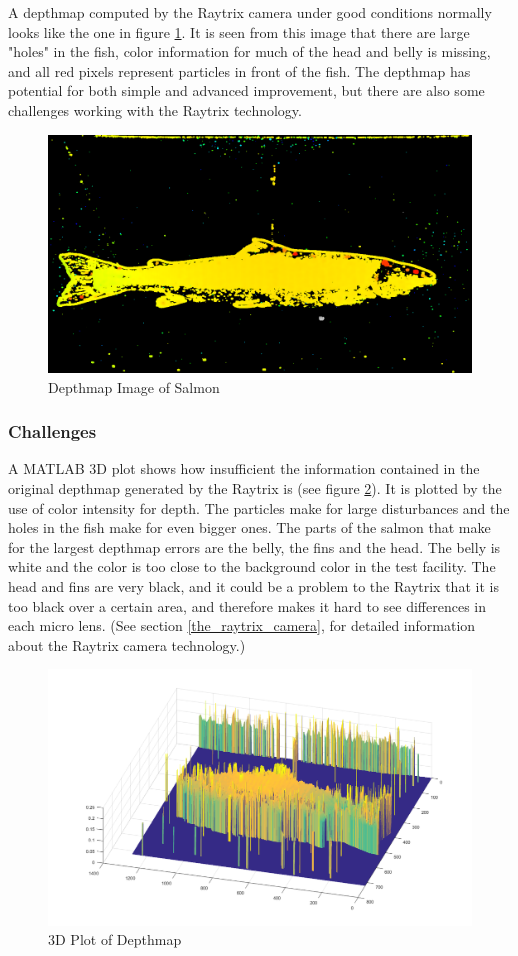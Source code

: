 A depthmap computed by the Raytrix camera under good conditions normally looks like the one in figure \ref{fig:depthmap82}. It is seen from this image that there are large "holes" in the fish, color information for much of the head and belly is missing, and all red pixels represent particles in front of the fish. The depthmap has potential for both simple and advanced improvement, but there are also some challenges working with the Raytrix technology.

\begin{figure}[H]
    \centering
    \includegraphics[width=.7\linewidth]{images/aim_of_study/depthmap82}
    \caption{Depthmap Image of Salmon}
    \label{fig:depthmap82}
\end{figure}



\subsubsection{Challenges}

A MATLAB 3D plot shows how insufficient the information contained in the original depthmap generated by the Raytrix is (see figure \ref{fig:matlab3D}). It is plotted by the use of color intensity for depth. The particles make for large disturbances and the holes in the fish make for even bigger ones. The parts of the salmon that make for the largest depthmap errors are the belly, the fins and the head. The belly is white and the color is too close to the background color in the test facility. The head and fins are very black, and it could be a problem to the Raytrix that it is too black over a certain area, and therefore makes it hard to see differences in each micro lens. (See section \ref{the_raytrix_camera}, for detailed information about the Raytrix camera technology.)

\begin{figure}[H]
    \centering
    \includegraphics[width=.7\linewidth]{images/aim_of_study/original_3D_87}
    \caption{3D Plot of Depthmap}
    \label{fig:matlab3D}
\end{figure}

